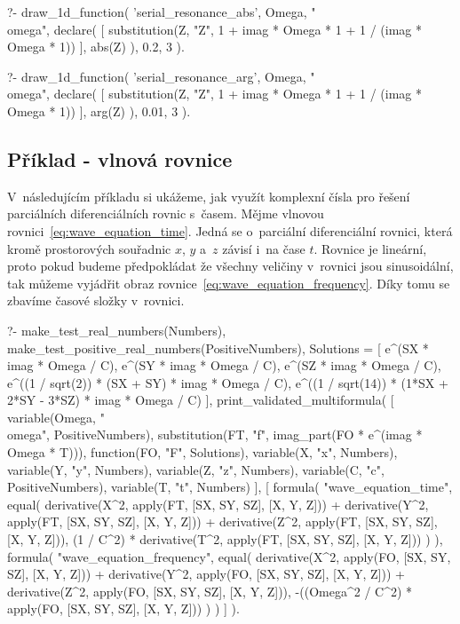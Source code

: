 \begin{prolog}
?-	draw_1d_function(
		'serial_resonance_abs',
		Omega,
		"\\omega",
		declare(
			[
				substitution(Z, "Z", 1 + imag * Omega * 1 + 1 / (imag * Omega * 1))
			],
			abs(Z)
		),
		0.2, 3
	).				
\end{prolog}

\begin{prolog}
?-	draw_1d_function(
		'serial_resonance_arg',
		Omega,
		"\\omega",
		declare(
			[
				substitution(Z, "Z", 1 + imag * Omega * 1 + 1 / (imag * Omega * 1))
			],
			arg(Z)
		),
		0.01, 3
	).				
\end{prolog}

\subsection{Příklad - vlnová rovnice}

V~následujícím příkladu si ukážeme, jak využít komplexní čísla pro řešení parciálních diferenciálních rovnic s~časem. Mějme vlnovou rovnici~\eqref{eq:wave_equation_time}.  Jedná se o~parciální diferenciální rovnici, která kromě prostorových souřadnic \(x\), \(y\) a~\(z\) závisí i~na čase \(t\). Rovnice je lineární, proto pokud budeme předpokládat že všechny veličiny v~rovnici jsou sinusoidální, tak můžeme vyjádřit obraz rovnice~\eqref{eq:wave_equation_frequency}. Díky tomu se zbavíme časové složky v~rovnici.

\begin{prolog}
?-	make_test_real_numbers(Numbers),
	make_test_positive_real_numbers(PositiveNumbers),
	Solutions = [
		e^(SX * imag * Omega / C),
		e^(SY * imag * Omega / C),
		e^(SZ * imag * Omega / C),
		e^((1 / sqrt(2)) * (SX + SY) * imag * Omega / C),
		e^((1 / sqrt(14)) * (1*SX + 2*SY - 3*SZ) * imag * Omega / C)
	],
	print_validated_multiformula(
		[
			variable(Omega, "\\omega", PositiveNumbers),
			substitution(FT, "f", imag_part(FO * e^(imag * Omega * T))),
			function(FO, "F", Solutions),
			variable(X, "x", Numbers),
			variable(Y, "y", Numbers),
			variable(Z, "z", Numbers),
			variable(C, "c", PositiveNumbers),
			variable(T, "t", Numbers)		
		],
		[
			formula(
				"wave_equation_time",
				equal(
					derivative(X^2, apply(FT, [SX, SY, SZ], [X, Y, Z])) +
					derivative(Y^2, apply(FT, [SX, SY, SZ], [X, Y, Z])) +
					derivative(Z^2, apply(FT, [SX, SY, SZ], [X, Y, Z])),
					(1 / C^2) * derivative(T^2, apply(FT, [SX, SY, SZ], [X, Y, Z]))
				)
			),
			formula(
				"wave_equation_frequency",
				equal(
					derivative(X^2, apply(FO, [SX, SY, SZ], [X, Y, Z])) +
					derivative(Y^2, apply(FO, [SX, SY, SZ], [X, Y, Z])) +
					derivative(Z^2, apply(FO, [SX, SY, SZ], [X, Y, Z])),
					-((Omega^2 / C^2) * apply(FO, [SX, SY, SZ], [X, Y, Z]))
				)
			)
		]
	).
\end{prolog}



